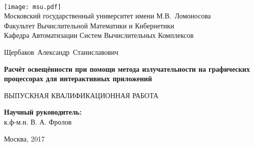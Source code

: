 \documentclass[12pt,fleqn]{article}
\begin{document}
\begin{titlepage}
\begin{center}
\ \vspace{-2cm}

    \texttt{[image: msu.pdf]}\\
    {Московский государственный университет имени М.В.~Ломоносова}\\
    Факультет Вычислительной Математики и Кибернетики\\
    Кафедра Автоматизации Систем Вычислительных Комплексов
    
    \vspace{3cm}

    {\Large Щербаков~Александр~Станиславович}

	\vspace{1cm}    
    
    {\Large\bfseries Расчёт освещённости при помощи метода излучательности на графических процессорах для интерактивных приложений\\}

	\vspace{1cm}

    {\large ВЫПУСКНАЯ КВАЛИФИКАЦИОННАЯ РАБОТА}

\end{center}

\vfill

    \begin{flushright}
            \textbf{Научный руководитель:}\\
            к.ф-м.н. В. А. Фролов
    \end{flushright}

\vfill

\begin{center}
    Москва, 2017
\end{center}

\end{titlepage}

\newpage
\renewcommand{\contentsname}{Содержание}
\tableofcontents

\newpage
\begin{abstract}
    В данной работе предлагается новый подход к реализации метода излучательности с использованием специальных преобразований матрицы форм-факторов. Данные модификации позволяют сократить объём вычислений для нескольких отражений света от поверхностей 3D-сцены за счёт вычислений специальной матрицы форм-факторов и её последующего сжатия методом DXT. Сжатие позволяет получить ускорение вычислений за счёт поддержки аппаратной декомпрессии данных указаного формата. Описанная реализация в 10 раз быстрее и требует в 3 раза меньше памяти, чем классический метод излучательности, реализованный на видеокарте.
\end{abstract}
\end{document}
